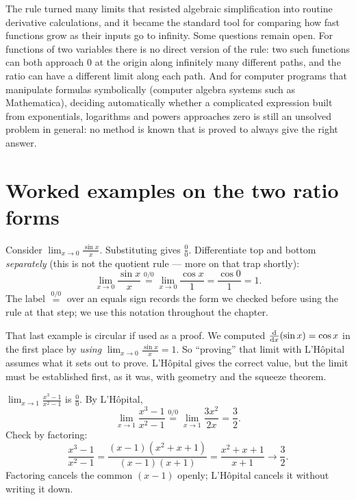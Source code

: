 \begin{historybox}
The rule turned many limits that resisted algebraic simplification into
routine derivative calculations, and it became the standard tool for comparing how
fast functions grow as their inputs go to infinity. Some questions remain open. For
functions of two variables there is no direct version of the rule:
two such functions can both approach $0$ at the origin along infinitely many
different paths, and the ratio can have a different limit along each path. And for
computer programs that manipulate formulas symbolically (computer algebra systems such
as Mathematica), deciding automatically whether a complicated expression built from
exponentials, logarithms and powers approaches zero is still an unsolved problem in
general: no method is known that is proved to always give the right answer.
\end{historybox}

\section{Worked examples on the two ratio forms}

\begin{example}\label{ch18:ex-sinx}
Consider $\displaystyle\lim_{x\to 0}\frac{\sin x}{x}$. Substituting gives
$\tfrac{0}{0}$. Differentiate top and bottom \emph{separately} (this is not the
quotient rule --- more on that trap shortly):
\[
\lim_{x\to 0}\frac{\sin x}{x}\overset{0/0}{=}\lim_{x\to 0}\frac{\cos x}{1}
=\frac{\cos 0}{1}=1.
\]
The label $\overset{0/0}{=}$ over an equals sign records the form we checked before
using the rule at that step; we use this notation throughout the chapter.
\end{example}

\begin{trapbox}
That last example is circular if used as a proof.
We computed $\frac{\mathrm{d}}{\mathrm{d} x}\!\left(\sin x\right)=\cos x$ in the first place by \emph{using}
$\lim_{x\to0}\tfrac{\sin x}{x}=1$. So ``proving'' that limit with L'H\^opital
assumes what it sets out to prove. L'H\^opital gives the correct
value, but the limit must be established first, as it was, with geometry and the
squeeze theorem.
\end{trapbox}

\begin{example}
$\displaystyle\lim_{x\to 1}\frac{x^3-1}{x^2-1}$ is $\tfrac{0}{0}$. By L'H\^opital,
\[
\lim_{x\to 1}\frac{x^3-1}{x^2-1}\overset{0/0}{=}\lim_{x\to 1}\frac{3x^2}{2x}
=\frac{3}{2}.
\]
Check by factoring:
\[
\frac{x^3-1}{x^2-1}=\frac{(x-1)(x^2+x+1)}{(x-1)(x+1)}
=\frac{x^2+x+1}{x+1}\to\frac{3}{2}.
\]
Factoring cancels the common $(x-1)$ openly; L'H\^opital cancels it without writing it
down.
\end{example}


